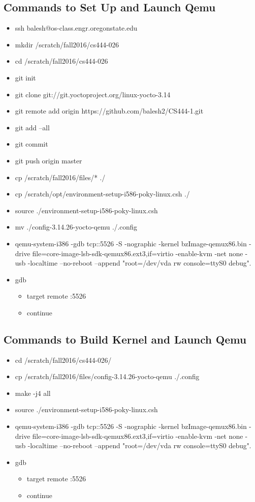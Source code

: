 \documentclass[letterpaper,10pt]{article}
\begin{document}
\subsection{Commands to Set Up and Launch Qemu}
\begin{itemize}
\item ssh balesh@os-class.engr.oregonstate.edu
\item mkdir /scratch/fall2016/cs444-026
\item cd /scratch/fall2016/cs444-026
\item git init
\item git clone git://git.yoctoproject.org/linux-yocto-3.14
\item git remote add origin https://github.com/balesh2/CS444-1.git
\item git add --all
\item git commit
\item git push origin master
\item cp /scratch/fall2016/files/* ./
\item cp /scratch/opt/environment-setup-i586-poky-linux.csh ./
\item source ./environment-setup-i586-poky-linux.csh
\item mv ./config-3.14.26-yocto-qemu ./.config
\item qemu-system-i386 -gdb tcp::5526 -S -nographic -kernel bzImage-qemux86.bin -drive \-file=core-image-lsb-sdk-qemux86.ext3,if=virtio -enable-kvm -net none -usb \- -localtime --no-reboot --append "root=/dev/vda rw console=ttyS0 debug".
\item gdb
\begin{itemize}
\item target remote :5526
\item continue
\end{itemize}
\end{itemize}

\subsection{Commands to Build Kernel and Launch Qemu}
\begin{itemize}
\item cd /scratch/fall2016/cs444-026/
\item cp /scratch/fall2016/files/config-3.14.26-yocto-qemu ./.config
\item make -j4 all
\item source ./environment-setup-i586-poky-linux.csh
\item qemu-system-i386 -gdb tcp::5526 -S -nographic -kernel bzImage-qemux86.bin -drive \-file=core-image-lsb-sdk-qemux86.ext3,if=virtio -enable-kvm -net none -usb \- -localtime --no-reboot --append "root=/dev/vda rw console=ttyS0 debug".
\item gdb
\begin{itemize}
\item target remote :5526
\item continue
\end{itemize}
\end{itemize}
\end{document}
